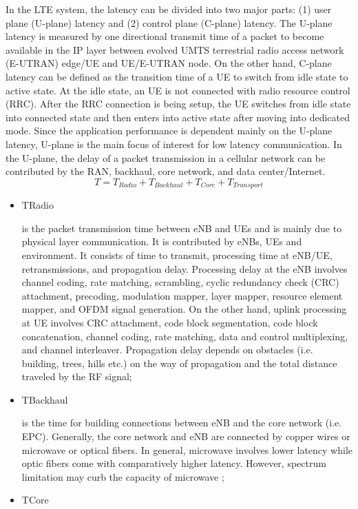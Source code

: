 \documentclass[conference]{IEEEtran}
\begin{document}
\begin{enumerate}
\begin{figure}
  \label{fig:delay}
\end{figure}
In the LTE system, the latency can be divided into two
major parts: (1) user plane (U-plane) latency and (2) control
plane (C-plane) latency. The U-plane latency is measured by 
one directional transmit time of a packet to become available
in the IP layer between evolved UMTS terrestrial radio access
network (E-UTRAN) edge/UE and UE/E-UTRAN node.
On the other hand, C-plane latency can be defined as the
transition time of a UE to switch from idle state to active
state. At the idle state, an UE is not connected with radio
resource control (RRC). After the RRC connection is being
setup, the UE switches from idle state into connected state
and then enters into active state after moving into dedicated
mode. Since the application performance is dependent mainly
on the U-plane latency, U-plane is the main focus of interest
for low latency communication.
In the U-plane, the delay of a packet transmission in a
cellular network can be contributed by the RAN, backhaul,
core network, and data center/Internet.
\begin{equation}
T = T_{Radio} + T_{Backhaul} + T_{Core} + T_{Transport}
\end{equation}
\begin{itemize}
\item TRadio

 is the packet transmission time between eNB and
UEs and is mainly due to physical layer communication.
It is contributed by eNBs, UEs and environment. It
consists of time to transmit, processing time at eNB/UE,
retransmissions, and propagation delay. Processing delay at the eNB involves channel coding, rate matching,
scrambling, cyclic redundancy check (CRC) attachment,
precoding, modulation mapper, layer mapper, resource
element mapper, and OFDM signal generation. On the
other hand, uplink processing at UE involves CRC attachment, code block segmentation, code block concatenation, channel coding, rate matching, data and control
multiplexing, and channel interleaver. Propagation delay
depends on obstacles (i.e. building, trees, hills etc.) on
the way of propagation and the total distance traveled by
the RF signal;
\item TBackhaul

 is the time for building connections between
eNB and the core network (i.e. EPC). Generally, the core
network and eNB are connected by copper wires or microwave or optical fibers. In general, microwave involves
lower latency while optic fibers come with comparatively
higher latency. However, spectrum limitation may curb
the capacity of microwave ;
\item TCore


\end{itemize}
\end{enumerate}
\end{document}
